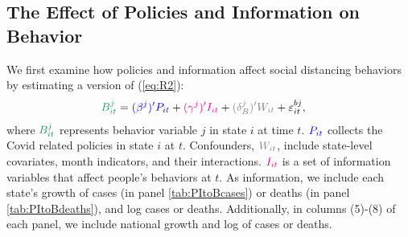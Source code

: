 \documentclass[11pt,reqno,letter]{amsart}
\theoremstyle{definition}
\def\bcolor{\color{ForestGreen}}
\def\pcolor{\color{blue}}
\def\icolor{\color{magenta}}
\def\wcolor{\color{gray}}
\begin{document}
\subsection{The Effect of Policies and Information on Behavior\label{policies-and-behavior}}

We first examine how policies and information affect social distancing behaviors by estimating a version of (\ref{eq:R2}):
\begin{align}
  {\bcolor B_{it}^j}
  & = {\pcolor (\beta^j)' P_{it}} + {\icolor (\gamma^j)' I_{it}} +
    {\wcolor (\delta_B^j)' W_{it}} + \varepsilon_{it}^{bj}, \notag
\end{align}
where ${\bcolor B_{it}^j}$ represents behavior variable $j$  in state  $i$ at time $t$.
${\pcolor P_{it}}$ collects the Covid related policies  in state $i$ at $t$.
Confounders, ${\wcolor W_{it}}$, include state-level covariates, month
indicators, and their interactions.
${\icolor I_{it}}$ is a set of information variables that affect
people's behaviors at $t$. As information, we include each state's
growth of cases (in panel \ref{tab:PItoBcases}) or deaths (in panel
\ref{tab:PItoBdeaths}), and log cases or deaths.  Additionally, in
columns (5)-(8) of each panel, we include national growth and log
of cases or deaths.
\end{document}
